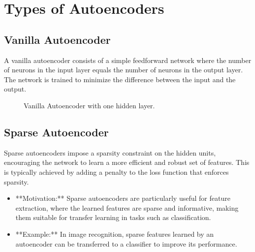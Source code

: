 \documentclass{article}
\begin{document}
\section{Types of Autoencoders}

\subsection{Vanilla Autoencoder}

A vanilla autoencoder consists of a simple feedforward network where the number of neurons in the input layer equals the number of neurons in the output layer. The network is trained to minimize the difference between the input and the output.

\begin{figure}[h]
    \centering
    \caption{Vanilla Autoencoder with one hidden layer.}
    \label{fig:vanilla_ae}
\end{figure}

\subsection{Sparse Autoencoder}

Sparse autoencoders impose a sparsity constraint on the hidden units, encouraging the network to learn a more efficient and robust set of features. This is typically achieved by adding a penalty to the loss function that enforces sparsity.

\begin{itemize}
    \item **Motivation:** Sparse autoencoders are particularly useful for feature extraction, where the learned features are sparse and informative, making them suitable for transfer learning in tasks such as classification.
    \item **Example:** In image recognition, sparse features learned by an autoencoder can be transferred to a classifier to improve its performance.
\end{itemize}
\end{document}
